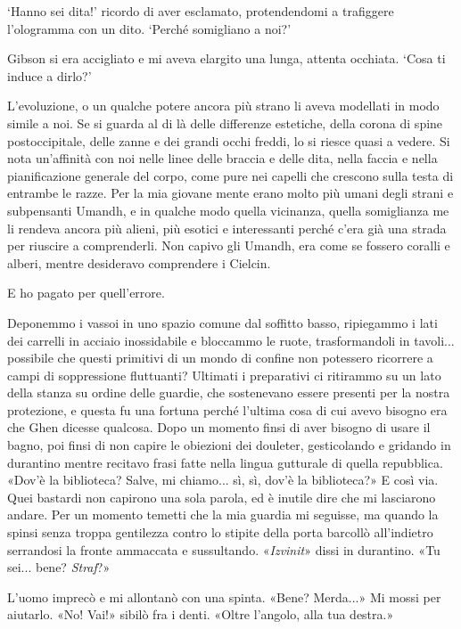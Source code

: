 `Hanno sei dita!' ricordo di aver esclamato, protendendomi a trafiggere
l'ologramma con un dito. `Perché somigliano a noi?'

Gibson si era accigliato e mi aveva elargito una lunga, attenta
occhiata. `Cosa ti induce a dirlo?'

L'evoluzione, o un qualche potere ancora più strano li aveva modellati
in modo simile a noi. Se si guarda al di là delle differenze estetiche,
della corona di spine postoccipitale, delle zanne e dei grandi occhi
freddi, lo si riesce quasi a vedere. Si nota un'affinità con noi nelle
linee delle braccia e delle dita, nella faccia e nella pianificazione
generale del corpo, come pure nei capelli che crescono sulla testa di
entrambe le razze. Per la mia giovane mente erano molto più umani degli
strani e subpensanti Umandh, e in qualche modo quella vicinanza, quella
somiglianza me li rendeva ancora più alieni, più esotici e interessanti
perché c'era già una strada per riuscire a comprenderli. Non capivo gli
Umandh, era come se fossero coralli e alberi, mentre desideravo
comprendere i Cielcin.

E ho pagato per quell'errore.

Deponemmo i vassoi in uno spazio comune dal soffitto basso, ripiegammo i
lati dei carrelli in acciaio inossidabile e bloccammo le ruote,
trasformandoli in tavoli... possibile che questi primitivi di un mondo
di confine non potessero ricorrere a campi di soppressione fluttuanti?
Ultimati i preparativi ci ritirammo su un lato della stanza su ordine
delle guardie, che sostenevano essere presenti per la nostra protezione,
e questa fu una fortuna perché l'ultima cosa di cui avevo bisogno era
che Ghen dicesse qualcosa. Dopo un momento finsi di aver bisogno di
usare il bagno, poi finsi di non capire le obiezioni dei douleter,
gesticolando e gridando in durantino mentre recitavo frasi fatte nella
lingua gutturale di quella repubblica. «Dov'è la biblioteca? Salve, mi
chiamo... sì, sì, dov'è la biblioteca?» E così via. Quei bastardi non
capirono una sola parola, ed è inutile dire che mi lasciarono andare.
Per un momento temetti che la mia guardia mi seguisse, ma quando la
spinsi senza troppa gentilezza contro lo stipite della porta barcollò
all'indietro serrandosi la fronte ammaccata e sussultando.
«\emph{Izvinit}» dissi in durantino. «Tu sei... bene? \emph{Straf}?»

L'uomo imprecò e mi allontanò con una spinta. «Bene? Merda...» Mi mossi
per aiutarlo. «No! Vai!» sibilò fra i denti. «Oltre l'angolo, alla tua
destra.»

